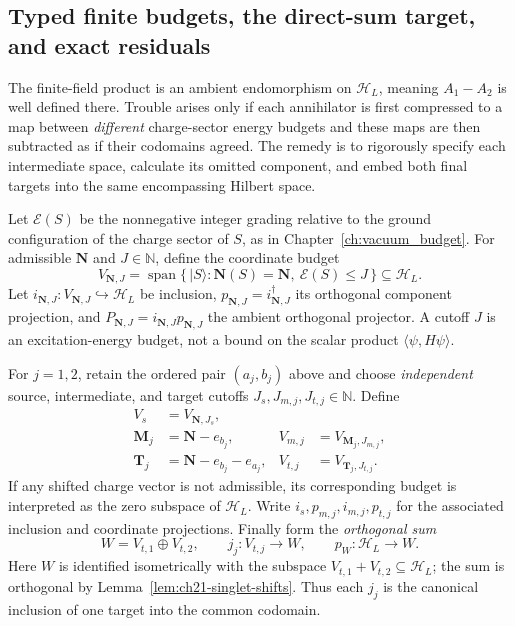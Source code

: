 \subsection*{Typed finite budgets, the direct-sum target, and exact residuals}

The finite-field product is an ambient endomorphism on \(\mathcal H_L\), meaning \(A_1-A_2\) is well defined there. Trouble arises only if each annihilator is first compressed to a map between \emph{different} charge-sector energy budgets and these maps are then subtracted as if their codomains agreed. The remedy is to rigorously specify each intermediate space, calculate its omitted component, and embed both final targets into the same encompassing Hilbert space.

Let \(\mathcal E(S)\) be the nonnegative integer grading relative to
the ground configuration of the charge sector of \(S\), as in
Chapter~\ref{ch:vacuum_budget}.  For admissible \(\mathbf N\) and
\(J\in\mathbb N\), define the coordinate budget
\begin{equation}
 V_{\mathbf N,J}
  =\operatorname{span}\{\,|S\rangle:\mathbf N(S)=\mathbf N,
                          \ \mathcal E(S)\leq J\,\}
  \subseteq\mathcal H_L.
 \label{eq:ch21-pair-budget}
\end{equation}
Let \(i_{\mathbf N,J}:V_{\mathbf N,J}\hookrightarrow\mathcal H_L\)
be inclusion, \(p_{\mathbf N,J}=i_{\mathbf N,J}^\dagger\) its
orthogonal component projection, and
\(P_{\mathbf N,J}=i_{\mathbf N,J}p_{\mathbf N,J}\) the ambient
orthogonal projector.  A cutoff \(J\) is an excitation-energy budget,
not a bound on the scalar product \(\langle\psi,H\psi\rangle\).

For \(j=1,2\), retain the ordered pair \((a_j,b_j)\) above and choose
\emph{independent} source, intermediate, and target cutoffs
\(J_s,J_{m,j},J_{t,j}\in\mathbb N\).  Define
\begin{equation}
 \begin{aligned}
 V_s&=V_{\mathbf N,J_s},\\
 \mathbf M_j&=\mathbf N-e_{b_j},
    &V_{m,j}&=V_{\mathbf M_j,J_{m,j}},\\
 \mathbf T_j&=\mathbf N-e_{b_j}-e_{a_j},
    &V_{t,j}&=V_{\mathbf T_j,J_{t,j}}.
 \end{aligned}
 \label{eq:ch21-pair-three-spaces}
\end{equation}
If any shifted charge vector is not admissible, its corresponding
budget is interpreted as the zero subspace of \(\mathcal H_L\).
Write \(i_s,p_{m,j},i_{m,j},p_{t,j}\) for the associated inclusion
and coordinate projections.  Finally form the \emph{orthogonal sum}
\begin{equation}
 W=V_{t,1}\oplus V_{t,2},\qquad
 j_j:V_{t,j}\longrightarrow W,\qquad
 p_W:\mathcal H_L\longrightarrow W.
 \label{eq:ch21-pair-common-target}
\end{equation}
Here \(W\) is identified isometrically with the subspace
\(V_{t,1}+V_{t,2}\subseteq\mathcal H_L\); the sum is orthogonal by
Lemma~\ref{lem:ch21-singlet-shifts}.  Thus each \(j_j\) is the
canonical inclusion of one target into the common codomain.

